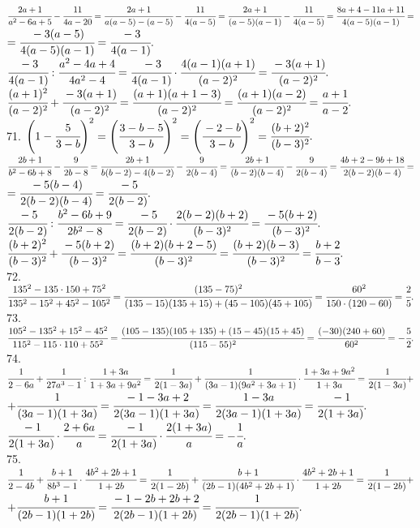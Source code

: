 $\cfrac{2a+1}{a^2-6a+5}-\cfrac{11}{4a-20}=\cfrac{2a+1}{a(a-5)-(a-5)}-\cfrac{11}{4(a-5)}=\cfrac{2a+1}{(a-5)(a-1)}-\cfrac{11}{4(a-5)}=
\cfrac{8a+4-11a+11}{4(a-5)(a-1)}=$\\$=\cfrac{-3(a-5)}{4(a-5)(a-1)}=\cfrac{-3}{4(a-1)}.$\\
$\cfrac{-3}{4(a-1)}:\cfrac{a^2-4a+4}{4a^2-4}=\cfrac{-3}{4(a-1)}\cdot\cfrac{4(a-1)(a+1)}{(a-2)^2}=\cfrac{-3(a+1)}{(a-2)^2}.$\\
$\cfrac{(a+1)^2}{(a-2)^2}+\cfrac{-3(a+1)}{(a-2)^2}=\cfrac{(a+1)(a+1-3)}{(a-2)^2}=\cfrac{(a+1)(a-2)}{(a-2)^2}=\cfrac{a+1}{a-2}.$\\
71. $\left(1-\cfrac{5}{3-b}\right)^2=\left(\cfrac{3-b-5}{3-b}\right)^2=\left(\cfrac{-2-b}{3-b}\right)^2=\cfrac{(b+2)^2}{(b-3)^2}.$\\
$\cfrac{2b+1}{b^2-6b+8}-\cfrac{9}{2b-8}=\cfrac{2b+1}{b(b-2)-4(b-2)}-\cfrac{9}{2(b-4)}=\cfrac{2b+1}{(b-2)(b-4)}-\cfrac{9}{2(b-4)}=
\cfrac{4b+2-9b+18}{2(b-2)(b-4)}=$\\$=\cfrac{-5(b-4)}{2(b-2)(b-4)}=\cfrac{-5}{2(b-2)}.$\\
$\cfrac{-5}{2(b-2)}:\cfrac{b^2-6b+9}{2b^2-8}=\cfrac{-5}{2(b-2)}\cdot\cfrac{2(b-2)(b+2)}{(b-3)^2}=\cfrac{-5(b+2)}{(b-3)^2}.$\\
$\cfrac{(b+2)^2}{(b-3)^2}+\cfrac{-5(b+2)}{(b-3)^2}=\cfrac{(b+2)(b+2-5)}{(b-3)^2}=\cfrac{(b+2)(b-3)}{(b-3)^2}=\cfrac{b+2}{b-3}.$\\
72. $\cfrac{135^2-135\cdot150+75^2}{135^2-15^2+45^2-105^2}=\cfrac{(135-75)^2}{(135-15)(135+15)+(45-105)(45+105)}=
\cfrac{60^2}{150\cdot(120-60)}=\cfrac{2}{5}.$\\
73. $\cfrac{105^2-135^2+15^2-45^2}{115^2-115\cdot110+55^2}=\cfrac{(105-135)(105+135)+(15-45)(15+45)}{(115-55)^2}=
\cfrac{(-30)(240+60)}{60^2}=-\cfrac{5}{2}.$\\
74. $\cfrac{1}{2-6a}+\cfrac{1}{27a^3-1}:\cfrac{1+3a}{1+3a+9a^2}=\cfrac{1}{2(1-3a)}+\cfrac{1}{(3a-1)(9a^2+3a+1)}\cdot\cfrac{1+3a+9a^2}{1+3a}=
\cfrac{1}{2(1-3a)}+$\\$+\cfrac{1}{(3a-1)(1+3a)}=\cfrac{-1-3a+2}{2(3a-1)(1+3a)}=\cfrac{1-3a}{2(3a-1)(1+3a)}=\cfrac{-1}{2(1+3a)}.$\\
$\cfrac{-1}{2(1+3a)}\cdot\cfrac{2+6a}{a}=\cfrac{-1}{2(1+3a)}\cdot\cfrac{2(1+3a)}{a}=-\cfrac{1}{a}.$\\
75. $\cfrac{1}{2-4b}+\cfrac{b+1}{8b^3-1}\cdot\cfrac{4b^2+2b+1}{1+2b}=\cfrac{1}{2(1-2b)}+\cfrac{b+1}{(2b-1)(4b^2+2b+1)}\cdot\cfrac{4b^2+2b+1}{1+2b}=
\cfrac{1}{2(1-2b)}+$\\$+\cfrac{b+1}{(2b-1)(1+2b)}=\cfrac{-1-2b+2b+2}{2(2b-1)(1+2b)}=\cfrac{1}{2(2b-1)(1+2b)}.$\\
